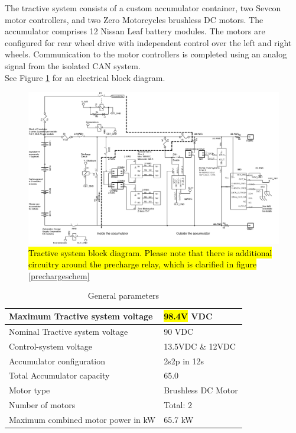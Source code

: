 \documentclass{article}
\DeclareRobustCommand{\hlr}[1]{{\sethlcolor{red}\hl{#1}}}
\begin{document}
    The tractive system consists of a custom accumulator container, two Sevcon motor controllers, and two Zero Motorcycles brushless DC motors. The accumulator comprises 12 Nissan Leaf battery modules. The motors are configured for rear wheel drive with independent control over the left and right wheels. Communication to the motor controllers is completed using an analog signal from the isolated CAN system.\\

    See Figure \ref{tractive} for an electrical block diagram.

        \begin{figure}
            \includegraphics[width=\textheight]{tractiveblock}
            \caption{\hlr{Tractive system block diagram. Please note that there is additional circuitry around the precharge relay, which is clarified in figure} \ref{prechargeschem}}
            \label{tractive}
        \end{figure}

        \begin{table}[H]
            \centering
            \begin{tabular}{|l|l|}
            \hline
                Maximum Tractive system voltage & \hlr{98.4V} VDC \\ \hline
                Nominal Tractive system voltage & 90 VDC \\ \hline
                Control-system voltage & 13.5VDC \& 12VDC\\ \hline
                Accumulator configuration & 2s2p in 12s \\ \hline
                Total Accumulator capacity & 65.0 \\ \hline
                Motor type & Brushless DC Motor \\ \hline
                Number of motors & Total: 2 \\ \hline
                Maximum combined motor power in kW & 65.7 kW \\ \hline
            \end{tabular}
            \caption{General parameters}
            \label{systemtable}
        \end{table}
\end{document}
